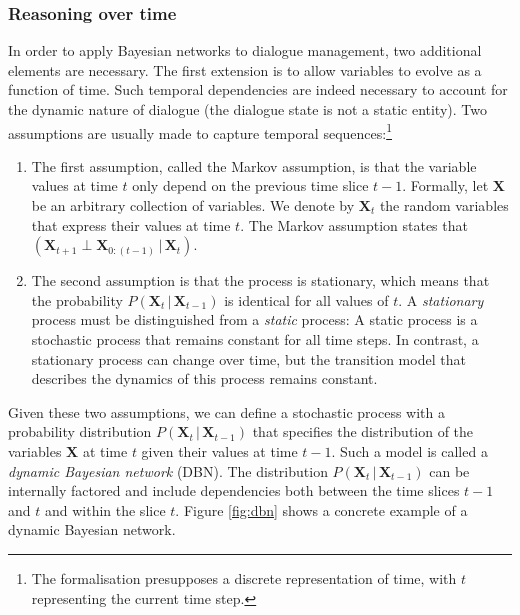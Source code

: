 \subsubsection*{Reasoning over time}

In order to apply Bayesian networks to dialogue management, two additional elements are necessary. The first extension is to allow variables to evolve as a function of time.  Such temporal dependencies are indeed necessary to account for the dynamic nature of dialogue (the dialogue state is not a static entity). Two assumptions are usually made to capture temporal sequences:\footnote{The formalisation presupposes a discrete representation of time, with $t$ representing the current time step.} \begin{enumerate}
\item The first assumption, called the Markov assumption, is that the variable values at time $t$ only depend on the previous time slice $t\!-\!1$.  Formally, let $\mathbf{X}$ be an arbitrary collection of variables. We denote by $\mathbf{X}_t$ the random variables that express their values at time $t$.  The Markov assumption states that $(\mathbf{X}_{t+1} \; \bot \; \mathbf{X}_{0:(t-1)}  \, | \,  \mathbf{X}_{t})$.  

\item The second assumption is that the process is stationary, which means that the probability $P(\mathbf{X}_t  \, | \,  \mathbf{X}_{t\!-\!1})$ is identical for all values of $t$. A \textit{stationary} process must be distinguished from a \textit{static} process: A static process is a stochastic process that remains constant for all time steps. In contrast, a stationary process can change over time, but the transition model that describes the dynamics of this process remains constant.
\end{enumerate}

Given these two assumptions, we can define a stochastic process with a probability distribution $P(\mathbf{X}_t  \, | \,  \mathbf{X}_{t\!-\!1})$ that specifies the distribution of the variables $\mathbf{X}$ at time $t$ given their values at time $t\!-\!1$. Such a model is called a \textit{dynamic Bayesian network} (DBN). The distribution $P(\mathbf{X}_t  \, | \,  \mathbf{X}_{t\!-\!1})$ can be internally factored and include dependencies both between the time slices $t\!-\!1$ and $t$ and within the slice $t$.  Figure \ref{fig:dbn} shows a concrete example of a dynamic Bayesian network. %

